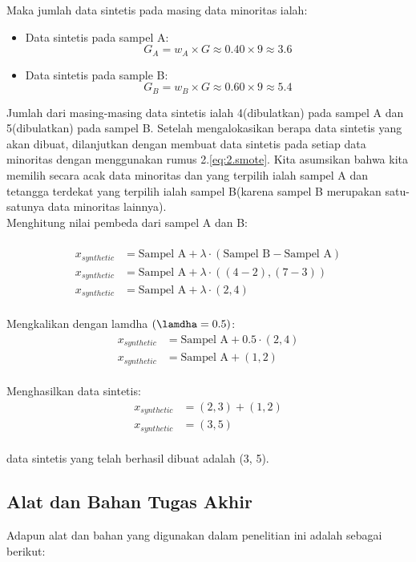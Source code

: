 Maka jumlah data sintetis pada masing data minoritas ialah:
\begin{itemize}
	\item Data sintetis pada sampel A:\\
		$$
			G_A = w_A \times G \approx 0.40 \times 9 \approx 3.6 
		$$
	\item Data sintetis pada sample B:\\
		$$
			G_B = w_B \times G \approx 0.60 \times 9 \approx 5.4 
		$$
\end{itemize}
Jumlah dari masing-masing data sintetis ialah 4(dibulatkan) pada sampel A dan 5(dibulatkan) pada sampel B. Setelah mengalokasikan berapa data sintetis yang akan dibuat, dilanjutkan dengan membuat data sintetis pada setiap data minoritas dengan menggunakan rumus 2.\ref{eq:2.smote}. Kita asumsikan bahwa kita memilih secara acak data minoritas dan yang terpilih ialah sampel A dan tetangga terdekat yang terpilih ialah sampel B(karena sampel B merupakan satu-satunya data minoritas lainnya).\\
Menghitung nilai pembeda dari sampel A dan B:\\
\\
\begin{align*}
    x_{synthetic} &= \text{Sampel A} + \lambda \cdot (\text{Sampel B} - \text{Sampel A})   \\
    x_{synthetic} &= \text{Sampel A} + \lambda \cdot ((4-2), (7-3)) \\
    x_{synthetic} &= \text{Sampel A} + \lambda \cdot (2,4) 
\end{align*}
\\
Mengkalikan dengan lamdha $(\lamdha = 0.5)$:
\\
\begin{align*}
    x_{synthetic} &= \text{Sampel A} + 0.5 \cdot (2,4) \\ 
    x_{synthetic} &= \text{Sampel A} + (1,2) 
\end{align*}
\\
Menghasilkan data sintetis:
\\
\begin{align*}
    x_{synthetic} &= (2,3) + (1,2) \\
    x_{synthetic} &= (3, 5) 
\end{align*}
\\
data sintetis yang telah berhasil dibuat adalah (3, 5).
 



\subsection{Alat dan Bahan Tugas Akhir}
Adapun alat dan bahan yang digunakan dalam penelitian ini adalah sebagai berikut:
